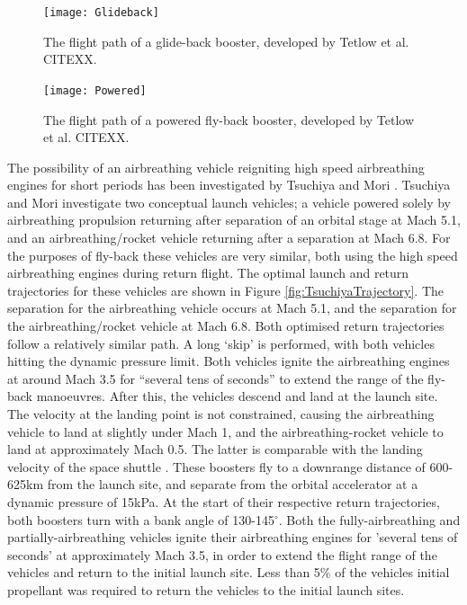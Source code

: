 \begin{figure}
\centering

\texttt{[image: Glideback]}
\caption{The flight path of a glide-back booster, developed by Tetlow et al. CITEXX.}

\label{fig:Glideback}
\end{figure}

\begin{figure}
\centering

\texttt{[image: Powered]}
\caption{The flight path of a powered fly-back booster, developed by Tetlow et al. CITEXX.}

\label{fig:Powered}
\end{figure}


The possibility of an airbreathing vehicle reigniting high speed airbreathing engines for short periods has been investigated by Tsuchiya and Mori \cite{Tsuchiya2005}.  Tsuchiya and Mori investigate two conceptual launch vehicles; a vehicle powered solely by airbreathing propulsion returning after separation of an orbital stage at Mach 5.1, and an airbreathing/rocket vehicle returning after a separation at Mach 6.8\cite{Tsuchiya2005}.  For the purposes of fly-back these vehicles are very similar, both using the high speed airbreathing engines during return flight. The optimal launch and return trajectories for these vehicles are shown in Figure \ref{fig:TsuchiyaTrajectory}. The separation for the airbreathing vehicle occurs at Mach 5.1, and the separation for the airbreathing/rocket vehicle at Mach 6.8. Both optimised return trajectories follow a relatively similar path. A long ‘skip’ is performed, with both vehicles hitting the dynamic pressure limit. Both vehicles ignite the airbreathing engines at around Mach 3.5 for “several tens of seconds” to extend the range of the fly-back manoeuvres. After this, the vehicles descend and land at the launch site. The velocity at the landing point is not constrained, causing the airbreathing vehicle to land at slightly under Mach 1, and the airbreathing-rocket vehicle to land at approximately Mach 0.5. The latter is comparable with the landing velocity of the space shuttle \cite{Romere1983}. 
These boosters fly to a downrange distance of 600-625km from the launch site, and separate from the orbital accelerator at a dynamic pressure of 15kPa\cite{Tsuchiya2005}. At the start of their respective return trajectories, both boosters turn with a bank angle of 130-145$^\circ$. Both the fully-airbreathing and partially-airbreathing vehicles ignite their airbreathing engines for 'several tens of seconds' at approximately Mach 3.5, in order to extend the flight range of the vehicles and return to the initial launch site\cite{Tsuchiya2005}. Less than 5\% of the vehicles initial propellant was required to return the vehicles to the initial launch sites\cite{Tsuchiya2005}.

